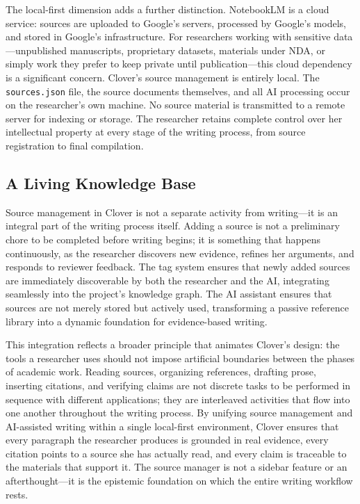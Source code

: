 \documentclass[a4paper,11pt]{article}
\begin{document}
The local-first dimension adds a further distinction. NotebookLM is a cloud service: sources are uploaded to Google's servers, processed by Google's models, and stored in Google's infrastructure. For researchers working with sensitive data---unpublished manuscripts, proprietary datasets, materials under NDA, or simply work they prefer to keep private until publication---this cloud dependency is a significant concern. Clover's source management is entirely local. The \texttt{sources.json} file, the source documents themselves, and all AI processing occur on the researcher's own machine. No source material is transmitted to a remote server for indexing or storage. The researcher retains complete control over her intellectual property at every stage of the writing process, from source registration to final compilation.

\subsection{A Living Knowledge Base}

Source management in Clover is not a separate activity from writing---it is an integral part of the writing process itself. Adding a source is not a preliminary chore to be completed before writing begins; it is something that happens continuously, as the researcher discovers new evidence, refines her arguments, and responds to reviewer feedback. The tag system ensures that newly added sources are immediately discoverable by both the researcher and the AI, integrating seamlessly into the project's knowledge graph. The AI assistant ensures that sources are not merely stored but actively used, transforming a passive reference library into a dynamic foundation for evidence-based writing.

This integration reflects a broader principle that animates Clover's design: the tools a researcher uses should not impose artificial boundaries between the phases of academic work. Reading sources, organizing references, drafting prose, inserting citations, and verifying claims are not discrete tasks to be performed in sequence with different applications; they are interleaved activities that flow into one another throughout the writing process. By unifying source management and AI-assisted writing within a single local-first environment, Clover ensures that every paragraph the researcher produces is grounded in real evidence, every citation points to a source she has actually read, and every claim is traceable to the materials that support it. The source manager is not a sidebar feature or an afterthought---it is the epistemic foundation on which the entire writing workflow rests.
\end{document}
